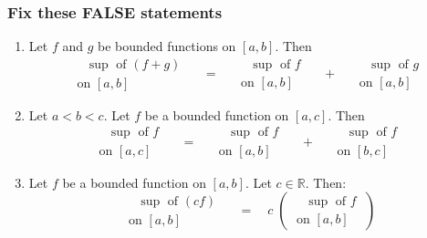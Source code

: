 \begin{frame}[t]
	\fontsize{13}{13}\selectfont
	\frametitle{Fix these FALSE statements}

	\begin{enumerate}
		\item Let $f$ and $g$ be bounded functions on $[a,b]$. Then
			\[
				\; \substack{\text{ $\sup$ of $(f+g)$} \\ \text{on $[a,b]$} }\; \quad = \quad
				\; \substack{\text{ $\sup$ of $f$} \\ \text{on $[a,b]$} }\; \quad + \quad
				\; \substack{\text{ $\sup$ of $g$} \\ \text{on $[a,b]$} }\;
			\]

			\vfill

		\item Let $a < b < c$. Let $f$ be a bounded function on $[a,c]$. Then
			\[
				\; \substack{\text{ $\sup$ of $f$} \\ \text{on $[a,c]$} }\; \quad = \quad
				\; \substack{\text{ $\sup$ of $f$} \\ \text{on $[a,b]$} }\; \quad + \quad
				\; \substack{\text{ $\sup$ of $f$} \\ \text{on $[b,c]$} }\;
			\]

			\vfill

		\item Let $f$ be a bounded function on $[a,b]$. Let $c \in \mathbb{R}$. Then:
			\[
				\; \substack{\text{ $\sup$ of $(cf)$} \\ \text{on $[a,b]$} }\; \quad = \quad
				c \; \left( \; \substack{\text{ $\sup$ of $f$} \\ \text{on $[a,b]$} }\; \right
				)
			\]
	\end{enumerate}
\end{frame}

